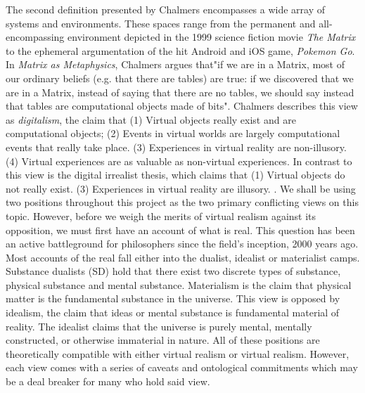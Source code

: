 The second definition presented by Chalmers encompasses a wide array of systems and environments. These spaces range from the permanent and all-encompassing environment depicted in the 1999 science fiction movie \textit{The Matrix} to the ephemeral argumentation of the hit Android and iOS game, \textit{Pokemon Go}. In \textit{Matrix as Metaphysics}, Chalmers argues that"if we are in a Matrix, most of our ordinary beliefs (e.g. that there are tables) are true: if we discovered that we are in a Matrix, instead of saying that there are no tables, we should say instead that tables are computational objects made of bits". Chalmers describes this view as \textit{digitalism}, the claim that (1) Virtual objects really exist and are computational objects;
(2) Events in virtual worlds are largely computational events that really take place. (3) Experiences in virtual reality are non-illusory.
(4) Virtual experiences are as valuable as non-virtual experiences. In contrast to this view is the digital irrealist thesis, which claims that (1) Virtual objects do not really exist. (3) Experiences in virtual reality are illusory. \cite{ChalmersVR}. We shall be using two positions throughout this project as the two primary conflicting views on this topic. However, before we weigh the merits of virtual realism against its opposition, we must first have an account of what is real. This question has been an active battleground for philosophers since the field's inception, 2000 years ago. Most accounts of the real fall either into the dualist, idealist or materialist camps. Substance dualists (SD) hold that there exist two discrete types of substance, physical substance and mental substance.  Materialism is the claim that physical matter is the fundamental substance in the universe. This view is opposed by idealism, the claim that ideas or mental substance is fundamental material of reality. The idealist claims that the universe is purely mental, mentally constructed, or otherwise immaterial in nature. All of these positions are theoretically compatible with either virtual realism or virtual realism. However, each view comes with a series of caveats and ontological commitments which may be a deal breaker for many who hold said view. 




